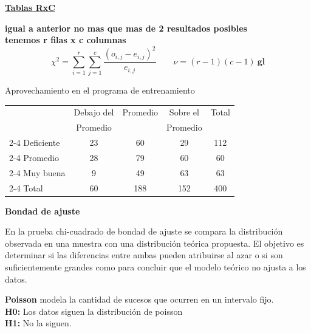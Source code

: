 \documentclass[10pt,a4paper]{article}
\begin{document}
{\large\bfseries\uline{Tablas RxC}\par}
\vspace{2pt}

\textbf{igual a anterior no mas que mas de 2 resultados posibles \\
tenemos r filas x c columnas}
\[
\chi^2 = \sum_{i=1}^{r}\sum_{j=1}^{c} \frac{\left(o_{i,j} - e_{i,j}\right)^2}{e_{i,j}}
\qquad
\nu = (r-1)(c-1) \ \textbf{gl}
\]

Aprovechamiento en el programa de entrenamiento

\begin{center}
\vspace{-2pt}
\begin{tabular}{l | c | c | c | c}
 & Debajo del & Promedio & Sobre el & Total \\
 & Promedio & & Promedio & \\
\cline{2-4}
Deficiente & 23 & 60 & 29 & 112 \\
\cline{2-4}
Promedio & 28 & 79 & 60 & 60 \\
\cline{2-4}
Muy buena & 9 & 49 & 63 & 63 \\
\cline{2-4}
Total & 60 & 188 & 152 & 400 \\
\end{tabular}
\end{center}

\textbf{Bondad de ajuste}

En la prueba chi-cuadrado de bondad de ajuste se compara la distribución observada en una muestra con una distribución teórica propuesta. El objetivo es determinar si las diferencias entre ambas pueden atribuirse al azar o si son suficientemente grandes como para concluir que el modelo teórico no ajusta a los datos.

\textbf{Poisson} modela la cantidad de sucesos que ocurren en un intervalo fijo.\\
\textbf{H0:} Los datos siguen la distribución de poisson\\
\textbf{H1:} No la siguen.
\end{document}
